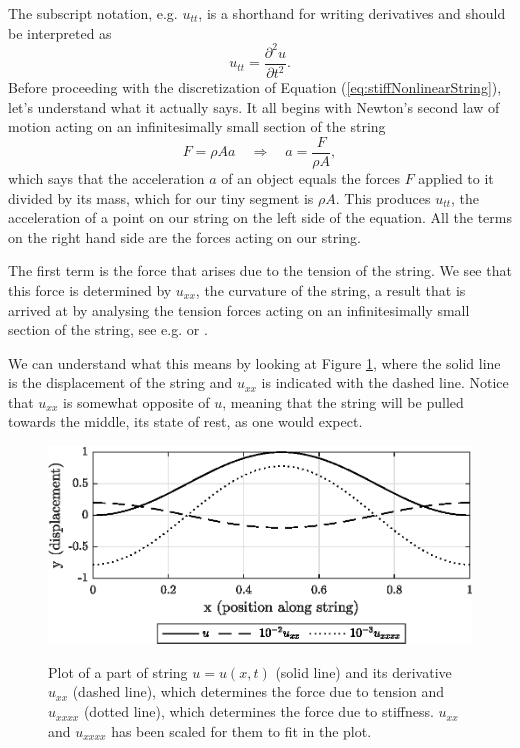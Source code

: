 \documentclass{article}
\begin{document}
\noindent The subscript notation, e.g. $u_{tt}$, is a shorthand for writing derivatives and should be interpreted as
\begin{equation}
  u_{tt} = \frac{\partial^2u}{\partial t^2}.
\end{equation}
%
Before proceeding with the discretization of Equation (\ref{eq:stiffNonlinearString}), let's understand what it actually says.
It all begins with Newton's second law of motion acting on an infinitesimally small section of the string
\begin{equation}
  F = \rho A a \quad \Rightarrow \quad a = \frac{F}{\rho A},
\end{equation}
which says that the acceleration $a$ of an object equals the forces $F$ applied to it divided by its mass, which for our tiny segment is $\rho A$.
This produces $u_{tt}$, the acceleration of a point on our string on the left side of the equation.
All the terms on the right hand side are the forces acting on our string.

The first term is the force that arises due to the tension of the string.
We see that this force is determined by $u_{xx}$, the curvature of the string, a result that is arrived at by analysing the tension forces acting on an infinitesimally small section of the string, see e.g. \cite[Chapter~2]{fletcher_physics_1998} or \cite[Chapter~6]{bilbao_numerical_2009}.

We can understand what this means by looking at Figure \ref{fig:diffplot}, where the solid line is the displacement of the string and $u_{xx}$ is indicated with the dashed line.
Notice that $u_{xx}$ is somewhat opposite of $u$, meaning that the string will be pulled towards the middle, its state of rest, as one would expect.

\begin{figure}[h]
  \includegraphics[width=\linewidth]{diffplot.eps}
  \label{fig:diffplot}
  \caption{Plot of a part of string $u = u(x,t)$ (solid line) and its derivative $u_{xx}$ (dashed line), which determines the force due to tension and $u_{xxxx}$ (dotted line), which determines the force due to stiffness. $u_{xx}$ and $u_{xxxx}$ has been scaled for them to fit in the plot.}
\end{figure}
\end{document}
